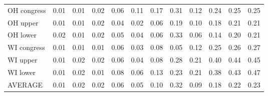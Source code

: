 \begin{tabular}{lrrrrrrrrrrr}
OH congress &     0.01 &     0.01 &     0.02 &   0.06 &   0.11 &   0.17 &       0.31 &  0.12 &   0.24 &    0.25 &     0.25 \\
OH upper    &     0.01 &     0.01 &     0.02 &   0.04 &   0.02 &   0.06 &       0.19 &  0.10 &   0.18 &    0.21 &     0.21 \\
OH lower    &     0.02 &     0.01 &     0.02 &   0.05 &   0.04 &   0.06 &       0.33 &  0.06 &   0.14 &    0.20 &     0.21 \\
WI congress &     0.01 &     0.01 &     0.01 &   0.06 &   0.03 &   0.08 &       0.05 &  0.12 &   0.25 &    0.26 &     0.27 \\
WI upper    &     0.01 &     0.02 &     0.02 &   0.06 &   0.04 &   0.08 &       0.28 &  0.21 &   0.40 &    0.44 &     0.45 \\
WI lower    &     0.01 &     0.02 &     0.01 &   0.08 &   0.06 &   0.13 &       0.23 &  0.21 &   0.38 &    0.43 &     0.47 \\
AVERAGE     &     0.01 &     0.02 &     0.02 &   0.06 &   0.05 &   0.10 &       0.32 &  0.09 &   0.18 &    0.22 &     0.23 \\
\bottomrule
\end{tabular}
